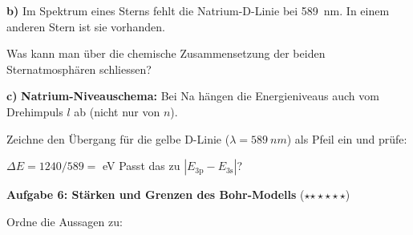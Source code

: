 \documentclass[11pt,a4paper]{article}
\newcommand{\aufgabe}[1]{\textbf{\textcolor{physik}{#1}}}
\newcommand{\luecke}[1]{\underline{\hspace{#1}}}
\newcommand{\niveau}[1]{\textcolor{physik}{\small (#1)}}
\newcommand{\sterne}[1]{\niveau{\ifcase#1\or$\star$\or$\star\star$\or$\star\star\star$\fi}}
\begin{document}
\vspace{0.5em}
\textbf{b)} Im Spektrum eines Sterns fehlt die Natrium-D-Linie bei \SI{589}{nm}. In einem anderen Stern ist sie vorhanden.

Was kann man \"uber die chemische Zusammensetzung der beiden Sternatmosph\"aren schliessen?

\vspace{1.5cm}

\textbf{c)} \textbf{Natrium-Niveauschema:} Bei Na h\"angen die Energieniveaus auch vom Drehimpuls $l$ ab (nicht nur von $n$).

\vspace{0.3em}
\begin{center}
\end{center}

\vspace{0.2em}
Zeichne den \"Ubergang f\"ur die gelbe D-Linie ($\lambda = \SI{589}{nm}$) als Pfeil ein und pr\"ufe:

$\Delta E = 1240 / 589 = $ \luecke{2cm} eV \quad Passt das zu $|E_\text{3p} - E_\text{3s}|$? \luecke{2cm}

\aufgabe{Aufgabe 6: St\"arken und Grenzen des Bohr-Modells} \sterne{2}

\vspace{0.3em}
Ordne die Aussagen zu:
\end{document}
